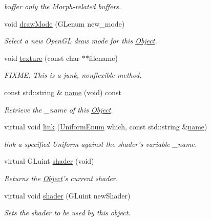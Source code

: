 \begin{DoxyCompactItemize}
\begin{DoxyCompactList}\small\item\em buffer only the Morph-\/related buffers. \end{DoxyCompactList}\item 
void \hyperlink{class_object_adafdf22583b051b4c61c8eb725fb07d5}{draw\-Mode} (G\-Lenum new\-\_\-mode)
\begin{DoxyCompactList}\small\item\em Select a new Open\-G\-L draw mode for this \hyperlink{class_object}{Object}. \end{DoxyCompactList}\item 
void \hyperlink{class_object_afebb27ddb10daed8e2c5085b76cbc500}{texture} (const char $\ast$$\ast$filename)
\begin{DoxyCompactList}\small\item\em F\-I\-X\-M\-E\-: This is a junk, nonflexible method. \end{DoxyCompactList}\item 
const std\-::string \& \hyperlink{class_object_aafd766fce2598f718cac97a3ac731706}{name} (void) const 
\begin{DoxyCompactList}\small\item\em Retrieve the \-\_\-name of this \hyperlink{class_object}{Object}. \end{DoxyCompactList}\item 
virtual void \hyperlink{class_object_a11d6063c580331d6af59c8d71b7f3e9f}{link} (\hyperlink{class_object_a79b74057dbc5182b85c9c3ba8480fcf2}{Uniform\-Enum} which, const std\-::string \&\hyperlink{class_object_aafd766fce2598f718cac97a3ac731706}{name})
\begin{DoxyCompactList}\small\item\em link a specified Uniform against the shader's variable \-\_\-name. \end{DoxyCompactList}\item 
virtual G\-Luint \hyperlink{class_object_a459489106838a1e3a8dbbd13045cd523}{shader} (void)
\begin{DoxyCompactList}\small\item\em Returns the \hyperlink{class_object}{Object}'s current shader. \end{DoxyCompactList}\item 
virtual void \hyperlink{class_object_aeaf11bb87bd59381c9e066f0b4f40d8e}{shader} (G\-Luint new\-Shader)
\begin{DoxyCompactList}\small\item\em Sets the shader to be used by this object. \end{DoxyCompactList}\item 
$$
\end{DoxyCompactItemize}
